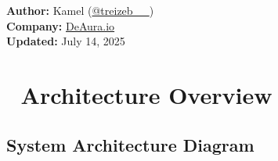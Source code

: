 \documentclass[11pt,a4paper]{article}
\begin{document}
\begin{titlepage}
    \vfill
    
    {\large\textbf{Author:} Kamel (\href{https://x.com/treizeb__}{@treizeb\_\_})\\
    \textbf{Company:} \href{https://deaura.io}{DeAura.io}\\
    \textbf{Updated:} July 14, 2025\par}
\end{titlepage}

\newpage
\tableofcontents
\newpage

\section{🎯 Architecture Overview}

\subsection{System Architecture Diagram}
\end{document}
